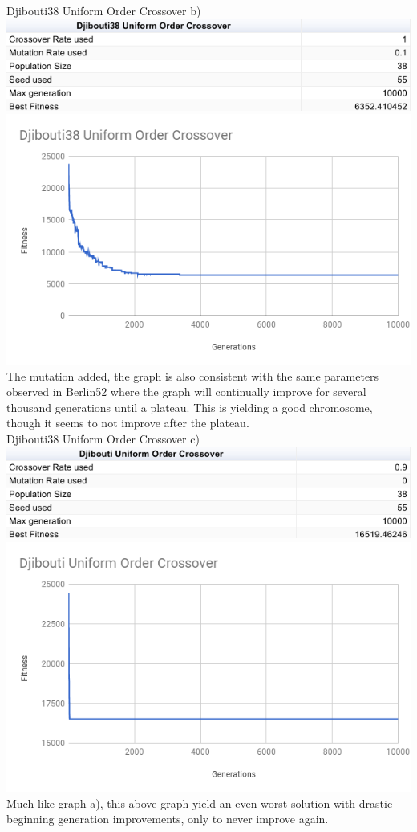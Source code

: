 \documentclass[conference]{IEEEtran}
\begin{document}
Djibouti38 Uniform Order Crossover b)
\includegraphics[scale=0.42]{Djibouti38/UOC/Djibouti38_UOC_b)_table}
\includegraphics[scale=0.42]{Djibouti38/UOC/Djibouti38_UOC_b)}
The mutation added, the graph is also consistent with the same parameters observed in Berlin52 where the graph will continually improve for several thousand generations until a plateau. This is yielding a good chromosome, though it seems to not improve after the plateau.\\


Djibouti38 Uniform Order Crossover c)
\includegraphics[scale=0.42]{Djibouti38/UOC/Djibouti38_UOC_c)_table}
\includegraphics[scale=0.42]{Djibouti38/UOC/Djibouti38_UOC_c)}
Much like graph a), this above graph yield an even worst solution with drastic beginning generation improvements, only to never improve again.\\
\end{document}
